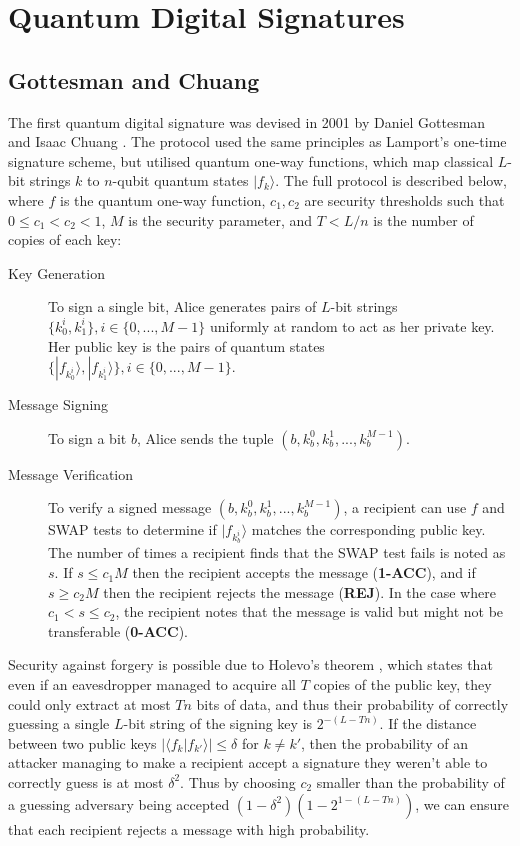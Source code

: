 \documentclass[%
 reprint,
 amsmath,amssymb,
 aps,
 pra,
]{revtex4-1}
\begin{document}
\section{Quantum Digital Signatures}

\subsection{Gottesman and Chuang}

The first quantum digital signature was devised in 2001 by Daniel Gottesman and Isaac Chuang \citep{quant-ph/0105032}. The protocol used the same principles as Lamport's one-time signature scheme, but utilised quantum one-way functions, which map classical $L$-bit strings $k$ to $n$-qubit quantum states $|f_k\rangle$. The full protocol is described below, where $f$ is the quantum one-way function, $c_1, c_2$ are security thresholds such that $0 \leq c_1 < c_2 < 1$, $M$ is the security parameter, and $T < L/n$ is the number of copies of each key:

\begin{description}
\item[Key Generation]To sign a single bit, Alice generates pairs of $L$-bit strings $\{k^i_0, k^i_1\}, i \in \{0,...,M-1\}$ uniformly at random to act as her private key. Her public key is the pairs of quantum states $\{|f_{k^i_0}\rangle, |f_{k^i_1}\rangle\}, i \in \{0,...,M-1\}$.
\item[Message Signing]To sign a bit $b$, Alice sends the tuple $(b, k^0_b, k^1_b,...,k^{M-1}_b)$.
\item[Message Verification]To verify a signed message $(b, k^0_b, k^1_b,...,k^{M-1}_b)$, a recipient can use $f$ and SWAP tests \cite{PhysRevLett.87.167902} to determine if $|f_{k^i_b}\rangle$ matches the corresponding public key. The number of times a recipient finds that the SWAP test fails is noted as $s$. If $s \leq c_1M$ then the recipient accepts the message (\textbf{1-ACC}), and if $s \geq c_2M$ then the recipient rejects the message (\textbf{REJ}). In the case where $c_1 < s \leq c_2$, the recipient notes that the message is valid but might not be transferable (\textbf{0-ACC}).
\end{description}

Security against forgery is possible due to Holevo's theorem \cite{Hol73}, which states that even if an eavesdropper managed to acquire all $T$ copies of the public key, they could only extract at most $Tn$ bits of data, and thus their probability of correctly guessing a single $L$-bit string of the signing key is $2^{-(L-Tn)}$. If the distance between two public keys $|\langle f_k|f_{k'}\rangle| \leq \delta$ for $k \neq k'$, then the probability of an attacker managing to make a recipient accept a signature they weren't able to correctly guess is at most $\delta^2$. Thus by choosing $c_2$ smaller than the probability of a guessing adversary being accepted $(1 - \delta^2)(1 - 2^{1 - (L-Tn)})$, we can ensure that each recipient rejects a message with high probability.
\end{document}
